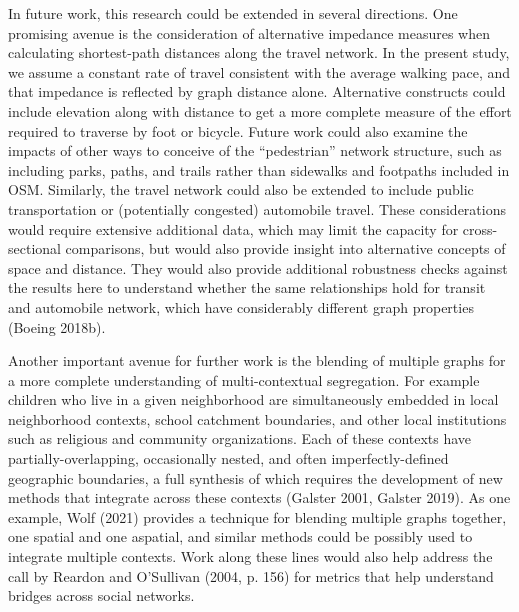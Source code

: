 \documentclass[
  10pt,
]{article}
\begin{document}
In future work, this research could be extended in several directions.
One promising avenue is the consideration of alternative impedance
measures when calculating shortest-path distances along the travel
network. In the present study, we assume a constant rate of travel
consistent with the average walking pace, and that impedance is
reflected by graph distance alone. Alternative constructs could include
elevation along with distance to get a more complete measure of the
effort required to traverse by foot or bicycle. Future work could also
examine the impacts of other ways to conceive of the ``pedestrian''
network structure, such as including parks, paths, and trails rather
than sidewalks and footpaths included in OSM. Similarly, the travel
network could also be extended to include public transportation or
(potentially congested) automobile travel. These considerations would
require extensive additional data, which may limit the capacity for
cross-sectional comparisons, but would also provide insight into
alternative concepts of space and distance. They would also provide
additional robustness checks against the results here to understand
whether the same relationships hold for transit and automobile network,
which have considerably different graph properties (Boeing 2018b).

Another important avenue for further work is the blending of multiple
graphs for a more complete understanding of multi-contextual
segregation. For example children who live in a given neighborhood are
simultaneously embedded in local neighborhood contexts, school catchment
boundaries, and other local institutions such as religious and community
organizations. Each of these contexts have partially-overlapping,
occasionally nested, and often imperfectly-defined geographic
boundaries, a full synthesis of which requires the development of new
methods that integrate across these contexts (Galster 2001, Galster
2019). As one example, Wolf (2021) provides a technique for blending
multiple graphs together, one spatial and one aspatial, and similar
methods could be possibly used to integrate multiple contexts. Work
along these lines would also help address the call by Reardon and
O'Sullivan (2004, p. 156) for metrics that help understand bridges
across social networks.
\end{document}
